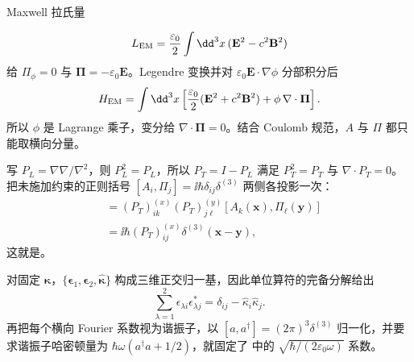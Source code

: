 \begin{derivation}[横向场的正则量子化与模式归一化]
Maxwell 拉氏量

\begin{equation*}
L_{\rm EM}=\frac{\varepsilon_0}{2}\int \dd^3 x\,(\mathbf E^2-c^2\mathbf B^2)
\end{equation*}
给 $\Pi_\phi=0$ 与 $\boldsymbol\Pi=-\varepsilon_0\mathbf E$。Legendre 变换并对 $\varepsilon_0\mathbf E\cdot\nabla\phi$ 分部积分后
\begin{equation*}
H_{\rm EM}=\int \dd^3 x\left[
\frac{\varepsilon_0}{2}(\mathbf E^2+c^2\mathbf B^2)
+\phi\,\nabla\cdot\boldsymbol\Pi\right].
\end{equation*}
所以 $\phi$ 是 Lagrange 乘子，变分给 $\nabla\cdot\boldsymbol\Pi=0$。结合 Coulomb 规范，$A$ 与 $\Pi$ 都只能取横向分量。

写 $P_L=\nabla\nabla/\nabla^2$，则 $P_L^2=P_L$，所以 $P_T=I-P_L$ 满足 $P_T^2=P_T$ 与 $\nabla\cdot P_T=0$。把未施加约束的正则括号 $[A_i,\Pi_j]=\ii\hbar\delta_{ij}\delta^{(3)}$ 两侧各投影一次：
\begin{align*}
[A_i^T(\mathbf x),\Pi_j^T(\mathbf y)]
&=(P_T)_{ik}^{(x)}(P_T)_{j\ell}^{(y)}
[A_k(\mathbf x),\Pi_\ell(\mathbf y)]\\
&=\ii\hbar(P_T)_{ij}^{(x)}\delta^{(3)}(\mathbf x-\mathbf y),
\end{align*}
这就是。

对固定 $\boldsymbol\kappa$，$\{\boldsymbol\epsilon_1,\boldsymbol\epsilon_2,\hat{\boldsymbol\kappa}\}$ 构成三维正交归一基，因此单位算符的完备分解给出
\begin{equation*}
\sum_{\lambda=1}^2\epsilon_{\lambda i}\epsilon_{\lambda j}^*
=\delta_{ij}-\hat\kappa_i\hat\kappa_j.
\end{equation*}
再把每个横向 Fourier 系数视为谐振子，以 $[a,a^\dagger]=(2\pi)^3\delta^{(3)}$ 归一化，并要求谐振子哈密顿量为 $\hbar\omega(a^\dagger a+1/2)$，就固定了 中的 $\sqrt{\hbar/(2\varepsilon_0\omega)}$ 系数。
\end{derivation}
